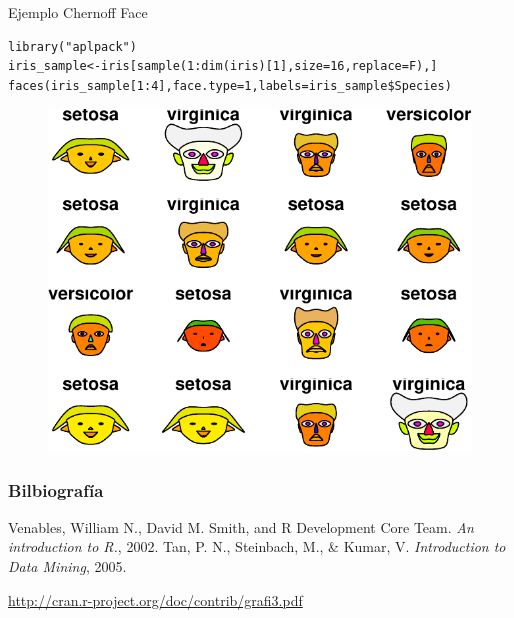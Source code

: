 \documentclass[handout]{beamer}
\begin{document}
\begin{frame}[fragile]{Ejemplo Chernoff Face}
\scriptsize{
\begin{verbatim}
library("aplpack")
iris_sample<-iris[sample(1:dim(iris)[1],size=16,replace=F),]
faces(iris_sample[1:4],face.type=1,labels=iris_sample$Species)
\end{verbatim}

  \begin{figure}[h!]
	\centering
	\includegraphics[scale=0.6]{pics/faces.pdf}		
\end{figure}   




}
 
\end{frame}



\begin{frame}[allowframebreaks]\scriptsize
\frametitle{Bilbiografía}
%
%
\begin{thebibliography}{8}

Venables, William N., David M. Smith, and R Development Core Team. \emph{An introduction to R.}, 2002.
Tan, P. N., Steinbach, M., \& Kumar, V. \emph{Introduction to Data Mining}, 2005.

\url{http://cran.r-project.org/doc/contrib/grafi3.pdf}
\end{thebibliography}


%
\end{frame}










\end{document}

